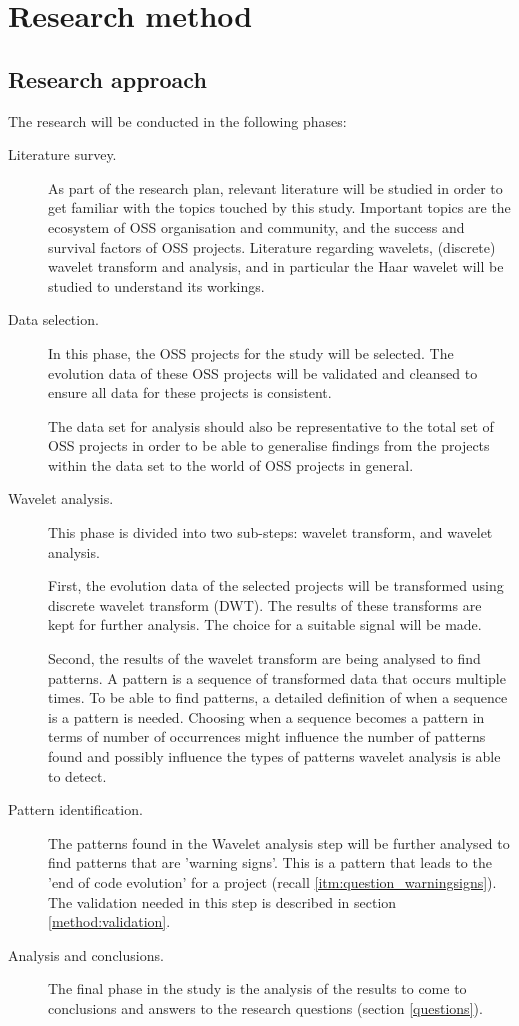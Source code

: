 \chapter{Research method}
\label{method}

\section{Research approach}
The research will be conducted in the following phases:
\begin{description}
	\item[Literature survey.] As part of the research plan, relevant literature
	will be studied in order to get familiar with the topics touched by this
	study. Important topics are the ecosystem of OSS organisation and community,
	and the success and survival factors of OSS projects. Literature regarding
	wavelets, (discrete) wavelet transform and analysis, and in particular the
	Haar wavelet will be studied to understand its workings.

	\item[Data selection.] In this phase, the OSS projects for the study will be
	selected. The evolution data of these OSS projects will be validated and
	cleansed to ensure all data for these projects is consistent.

	The data set for analysis should also be representative to the total set of
	OSS projects in order to be able to generalise findings from the
	projects within the data set to the world of OSS projects in general.
	
	\item[Wavelet analysis.] This phase is divided into two sub-steps: wavelet
	transform, and wavelet analysis.
	
	First, the evolution data of the selected projects will be transformed using
	discrete wavelet transform (DWT). The results of these transforms are kept for
	further analysis. The choice for a suitable signal will be made.
	
	Second, the results of the wavelet transform are being analysed to find
	patterns. A pattern is a sequence of transformed data that occurs multiple
	times. To be able to find patterns, a detailed definition of when a sequence
	is a pattern is needed. Choosing when a sequence becomes a pattern in terms of
	number of occurrences might influence the number of patterns found and
	possibly influence the types of patterns wavelet analysis is able to detect.
	
	\item[Pattern identification.] The patterns found in the Wavelet analysis step
	will be further analysed to find patterns that are 'warning signs'. This is a
	pattern that leads to the 'end of code evolution' for a project (recall
	\ref{itm:question_warningsigns}). The validation needed in this step is
	described in section \ref{method:validation}.
	
	\item[Analysis and conclusions.] The final phase in the study is the analysis
	of the results to come to conclusions and answers to the research questions
	(section \ref{questions}).
\end{description}

